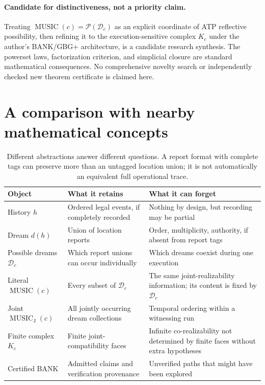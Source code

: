 \documentclass[11pt,letterpaper]{article}
\theoremstyle{definition}
\theoremstyle{remark}
\newcommand{\PSet}{\mathcal{P}}
\newcommand{\Dream}{\mathcal{D}}
\newcommand{\Music}{\operatorname{MUSIC}}
\newcommand{\JMusic}{\operatorname{MUSIC}_{\mathrm J}}
\begin{document}
\paragraph{Candidate for distinctiveness, not a priority claim.} Treating $\Music(c)=\PSet(\Dream_c)$ as an explicit coordinate of ATP reflective possibility, then refining it to the execution-sensitive complex $K_c$ under the author's BANK/GBG+ architecture, is a candidate research synthesis. The powerset laws, factorization criterion, and simplicial closure are standard mathematical consequences. No comprehensive novelty search or independently checked new theorem certificate is claimed here.

\section{A comparison with nearby mathematical concepts}
\begin{table}[htbp]
\centering\small
\renewcommand{\arraystretch}{1.18}
\begin{tabularx}{\textwidth}{@{}p{}X X@{}}
\toprule
Object & What it retains & What it can forget \\
\midrule
History $h$ & Ordered legal events, if completely recorded & Nothing by design, but recording may be partial \\
Dream $d(h)$ & Union of location reports & Order, multiplicity, authority, if absent from report tags \\
Possible dreams $\Dream_c$ & Which report unions can occur individually & Which dreams coexist during one execution \\
Literal $\Music(c)$ & Every subset of $\Dream_c$ & The same joint-realizability information; its content is fixed by $\Dream_c$ \\
Joint $\JMusic(c)$ & All jointly occurring dream collections & Temporal ordering within a witnessing run \\
Finite complex $K_c$ & Finite joint-compatibility faces & Infinite co-realizability not determined by finite faces without extra hypotheses \\
Certified BANK & Admitted claims and verification provenance & Unverified paths that might have been explored \\
\bottomrule
\end{tabularx}
\caption{Different abstractions answer different questions. A report format with complete tags can preserve more than an untagged location union; it is not automatically an equivalent full operational trace.}
\end{table}
\end{document}
